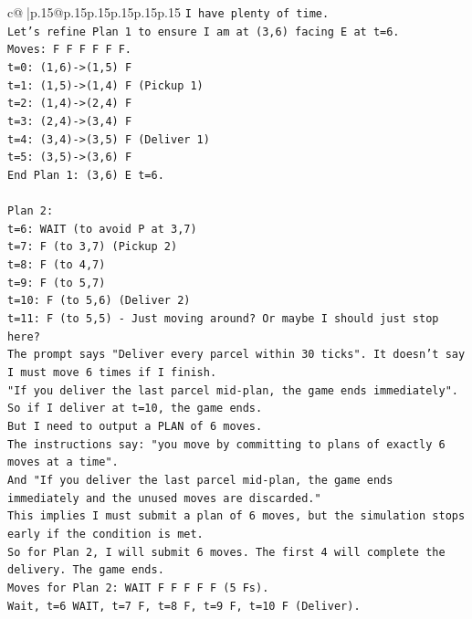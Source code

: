 \documentclass{article}
\begin{document}
{\begin{supertabular}{c@{$\;$}|p{.15\linewidth}@{}p{.15\linewidth}p{.15\linewidth}p{.15\linewidth}p{.15\linewidth}p{.15\linewidth}}
{{{\texttt{I have plenty of time.} \\
\texttt{Let's refine Plan 1 to ensure I am at (3,6) facing E at t=6.} \\
\texttt{Moves: F F F F F F.} \\
\texttt{t=0: (1,6){-}>(1,5) F} \\
\texttt{t=1: (1,5){-}>(1,4) F (Pickup 1)} \\
\texttt{t=2: (1,4){-}>(2,4) F} \\
\texttt{t=3: (2,4){-}>(3,4) F} \\
\texttt{t=4: (3,4){-}>(3,5) F (Deliver 1)} \\
\texttt{t=5: (3,5){-}>(3,6) F} \\
\texttt{End Plan 1: (3,6) E t=6.} \\
\\ 
\texttt{Plan 2:} \\
\texttt{t=6: WAIT (to avoid P at 3,7)} \\
\texttt{t=7: F (to 3,7) (Pickup 2)} \\
\texttt{t=8: F (to 4,7)} \\
\texttt{t=9: F (to 5,7)} \\
\texttt{t=10: F (to 5,6) (Deliver 2)} \\
\texttt{t=11: F (to 5,5) {-} Just moving around? Or maybe I should just stop here?} \\
\texttt{The prompt says "Deliver every parcel within 30 ticks". It doesn't say I must move 6 times if I finish.} \\
\texttt{"If you deliver the last parcel mid{-}plan, the game ends immediately".} \\
\texttt{So if I deliver at t=10, the game ends.} \\
\texttt{But I need to output a PLAN of 6 moves.} \\
\texttt{The instructions say: "you move by committing to plans of exactly 6 moves at a time".} \\
\texttt{And "If you deliver the last parcel mid{-}plan, the game ends immediately and the unused moves are discarded."} \\
\texttt{This implies I must submit a plan of 6 moves, but the simulation stops early if the condition is met.} \\
\texttt{So for Plan 2, I will submit 6 moves. The first 4 will complete the delivery. The game ends.} \\
\texttt{Moves for Plan 2: WAIT F F F F F (5 Fs).} \\
\texttt{Wait, t=6 WAIT, t=7 F, t=8 F, t=9 F, t=10 F (Deliver).} \\
}}}
\end{supertabular}}
\end{document}
